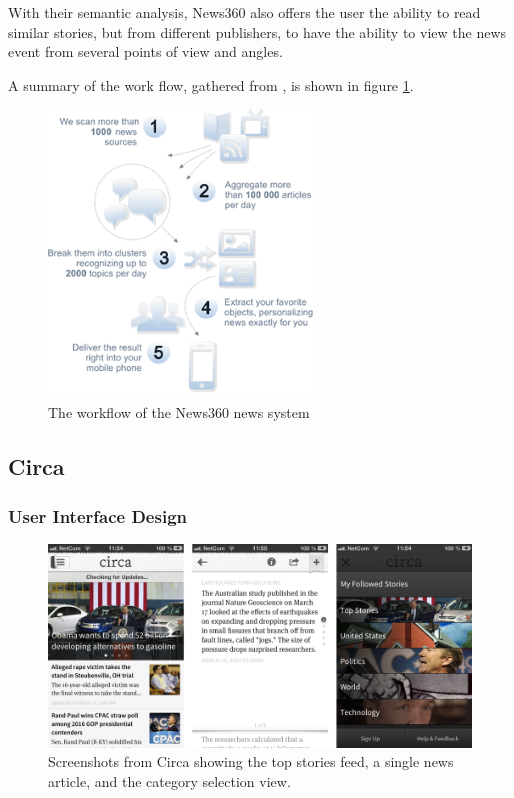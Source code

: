 With their semantic analysis, News360 also offers the user the ability to read similar stories, but from different publishers, to have the ability to view the news event from several points of view and angles.

A summary of the work flow, gathered from \cite{news360_technology}, is shown in figure \ref{tech_news360_workflow}.



\begin{figure}[!htbp]
\centering
\includegraphics[width=70mm]{GFX/tech/news360workflow.png}
\caption{The workflow of the News360 news system}
\label{tech_news360_workflow}
\end{figure}


\subsection{Circa}

\subsubsection{User Interface Design}

\begin{figure}[!htbp]
\centering
\includegraphics[width=130mm]{GFX/screenshots/circa.png}
\caption{Screenshots from Circa showing the top stories feed, a single news article, and the category selection view.}
\label{screenshots_circa}
\end{figure}

